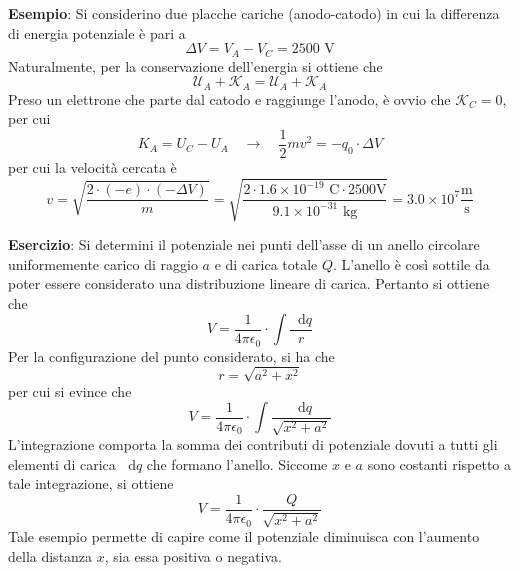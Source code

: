 \documentclass[a4paper]{extarticle}
\newcommand\dif{\mathop{}\!\mathrm{d}}
\begin{document}
\vspace{1em}
\noindent
\textbf{Esempio}: Si considerino due placche cariche (anodo-catodo) in cui la differenza di energia potenziale è pari a
\[\Delta V = V_A-V_C=2500 \text{ V}\]
Naturalmente, per la conservazione dell'energia si ottiene che
\[\mathcal{U}_A+\mathcal{K}_A=\mathcal{U}_A+\mathcal{K}_A\]
Preso un elettrone che parte dal catodo e raggiunge l'anodo, è ovvio che $\mathcal{K}_C=0$, per cui
\[K_A=U_C-U_A \hspace{1em} \rightarrow \hspace{1em} \frac{1}{2}mv^2 = - q_0 \cdot \Delta V\]
per cui la velocità cercata è
\[v = \sqrt{\frac{2 \cdot (-e) \cdot (-\Delta V)}{m}} = \sqrt{\frac{2 \cdot 1.6 \times 10^{-19} \text{ C} \cdot 2500 \text{V}}{9.1 \times 10^{-31} \text{ kg}}} = 3.0 \times 10^7 \frac{\text{m}}{\text{s}}\]

\vspace{1em}
\noindent
\textbf{Esercizio}: Si determini il potenziale nei punti dell'asse di un anello circolare uniformemente carico di raggio $a$ e di carica totale $Q$. L'anello è così sottile da poter essere considerato una distribuzione lineare di carica. Pertanto si ottiene che
\[V=\frac{1}{4 \pi \epsilon_0} \cdot \int \frac{\dif q}{r}\]
Per la configurazione del punto considerato, si ha che
\[r=\sqrt{a^2+x^2}\]
per cui si evince che
\[V=\frac{1}{4 \pi \epsilon_0} \cdot \int \frac{\dif q}{\sqrt{x^2+a^2}}\]
L'integrazione comporta la somma dei contributi di potenziale dovuti a tutti gli elementi di carica $\dif q$ che formano l'anello. Siccome $x$ e $a$ sono costanti rispetto a tale integrazione, si ottiene
\[V= \frac{1}{4 \pi \epsilon_0} \cdot \frac{Q}{\sqrt{x^2+a^2}}\]
Tale esempio permette di capire come il potenziale diminuisca con l'aumento della distanza $x$, sia essa positiva o negativa.

\vspace{1em}
\noindent
\end{document}
